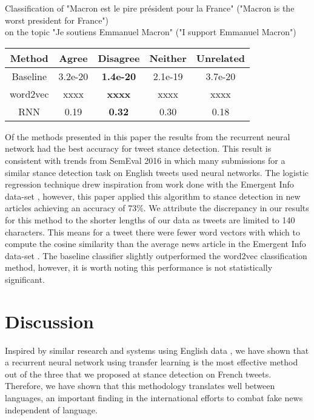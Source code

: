 \documentclass[journal]{IEEEtran}
\begin{document}
Classification of "Macron est le pire pr\'{e}sident pour la France" ("Macron is the worst president for France") \\ on the topic "Je soutiens Emmanuel Macron" ("I support Emmanuel Macron")
\begin{center}
\begin{tabular}{ | c | c | c | c | c |}
\hline
Method & Agree & Disagree & Neither & Unrelated \\[0.7ex]
\hline
Baseline & 3.2e-20 & \textbf{1.4e-20} & 2.1e-19 & 3.7e-20\\
word2vec & xxxx & \textbf{xxxx} & xxxx & xxxx \\
RNN & 0.19 & \textbf{0.32} & 0.30 & 0.18 \\
\hline
\end{tabular}
\end{center}


Of the methods presented in this paper the results from the recurrent neural network had the best accuracy for tweet stance detection. This result is consistent with trends from SemEval 2016 \cite{DBLP:journals/corr/ZarrellaM16} in which many submissions for a similar stance detection task on English tweets used neural networks. The logistic regression technique drew inspiration from work done with the Emergent Info data-set \cite{ferreira_vlachos_2016}, however, this paper applied this algorithm to stance detection in new articles achieving an accuracy of 73\%. We attribute the discrepancy in our results for this method to the shorter lengths of our data as tweets are limited to 140 characters. This means for a tweet there were fewer word vectors with which to compute the cosine similarity than the average news article in the Emergent Info data-set \cite{ferreira_vlachos_2016}. The baseline classifier slightly outperformed the word2vec classification method, however, it is worth noting this performance is not statistically significant. 

\section{Discussion}

Inspired by similar research and systems using English data \cite{DBLP:journals/corr/ZarrellaM16}, we have shown that a recurrent neural network using transfer learning is the most effective method out of the three that we proposed at stance detection on French tweets. Therefore, we have shown that this methodology translates well between languages, an important finding in the international efforts to combat fake news independent of language. 
\end{document}
